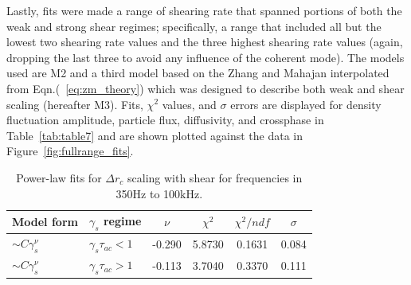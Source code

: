 \documentclass[aip,pop,amsmath,amssymb,preprint,superscriptaddress]{revtex4-1} %
\begin{document}
Lastly, fits were made a range of shearing rate that spanned
portions of both the weak and strong shear regimes; specifically, a
range that included all but the lowest two shearing rate values and
the three highest shearing rate values (again, dropping the last three to avoid any influence of the coherent mode). The models used are M2 and a third model based on the Zhang and Mahajan interpolated from Eqn.(~\ref{eq:zm_theory}) which was designed to describe both weak and shear scaling (hereafter M3). Fits, $\chi^{2}$ values, and $\sigma$ errors are displayed for density fluctuation amplitude, particle flux, diffusivity, and crossphase in Table~\ref{tab:table7} and are shown plotted against the data in Figure~\ref{fig:fullrange_fits}.

\begin{table}
\caption{\label{tab:table6}Power-law fits for $\Delta r_{c}$ scaling with shear for frequencies in 350Hz to 100kHz.}
\begin{ruledtabular}
\begin{tabular}{llcccc}
Model form&$\gamma_{s}$ regime&$\nu$&$\chi^2$&$\chi^2/ndf$&$\sigma$\\
\hline
$\sim C\gamma_{s}^\nu$&$\gamma_{s}\tau_{ac}<1$ &-0.290 &5.8730 &0.1631 &0.084\\
$\sim C\gamma_{s}^\nu$&$\gamma_{s}\tau_{ac}>1$ &-0.113 &3.7040 &0.3370 &0.111\\
\end{tabular}
\end{ruledtabular}
\end{table}
\end{document}
